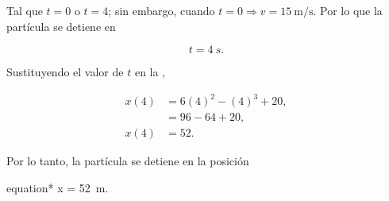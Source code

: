 \documentclass[../main.tex]{subfiles}
\begin{document}
\begin{problema}
	Tal que \(t = 0\) o \(t = 4\); sin embargo, cuando \(t = 0 \Rightarrow v = \qty{15}{\m\per\s}\).
	Por lo que la partícula se detiene en

	\begin{equation*}
		t = \qty{4}{s}.
	\end{equation*}

	Sustituyendo el valor de \(t\) en la ,

	\begin{align*}
		x(4) & = 6(4)^{2} - (4)^{3} + 20, \\
		     & = 96 - 64 + 20,            \\
		x(4) & = 52.
	\end{align*}

	Por lo tanto, la partícula se detiene en la posición

	\begin{empheq}[box=\mainresult]{equation*}
		x = \qty{52}{m}.
	\end{empheq}
\end{problema}
\end{document}
